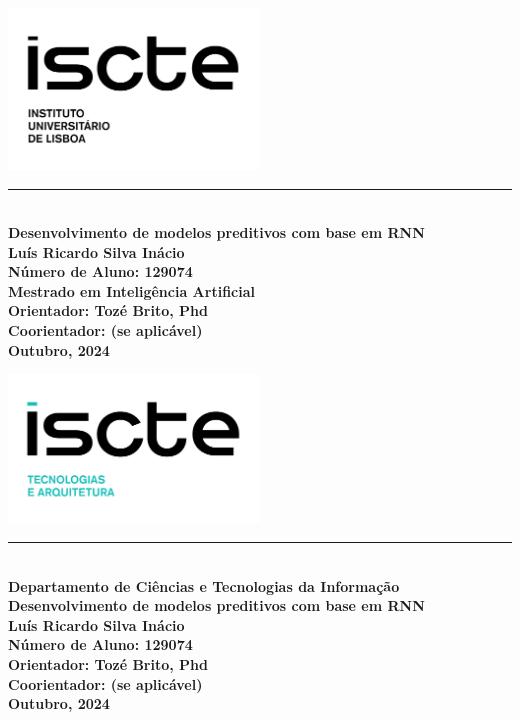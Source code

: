 \documentclass[a4paper,12pt]{report}
\begin{document}
	
	\begin{titlepage}
		\begin{flushleft}
			\includegraphics[width=0.5\textwidth]{iscte.png}\\[1cm]
		\end{flushleft}
		\noindent
		\textcolor{barraazul}{\rule{\textwidth}{1mm}} %
		\\[0.5cm]
		{\Huge \textbf{\centering Desenvolvimento de modelos preditivos com base em RNN}}\\[1.5cm]
		\noindent
		\textbf{Luís Ricardo Silva Inácio}\\
		\textbf{Número de Aluno: 129074}\\[2cm]
		\textbf{Mestrado em Inteligência Artificial}\\[1.5cm]
		\textbf{Orientador: Tozé Brito, Phd}\\
		\textbf{Coorientador: (se aplicável)}\\[3cm]
		\textbf{Outubro, 2024}
	\end{titlepage}
	
	\newpage
	\thispagestyle{empty}
	\mbox{}
	\newpage
	
	\begin{titlepage}
		\begin{flushleft}
			\includegraphics[width=0.5\textwidth]{ista.png}\\[1cm]
		\end{flushleft}
		\noindent
		\textcolor{barraazul}{\rule{\textwidth}{1mm}} %
		\\[0.5cm]
		{\Large \textbf{\centering Departamento de Ciências e Tecnologias da Informação}}\\[1cm]
		{\Huge \textbf{\centering Desenvolvimento de modelos preditivos com base em RNN}}\\[1.5cm]
		\noindent
		\textbf{Luís Ricardo Silva Inácio}\\
		\textbf{Número de Aluno: 129074}\\[2cm]
		\textbf{Orientador: Tozé Brito, Phd}\\
		\textbf{Coorientador: (se aplicável)}\\[3cm]
		\textbf{Outubro, 2024}
	\end{titlepage}
	
\end{document}
